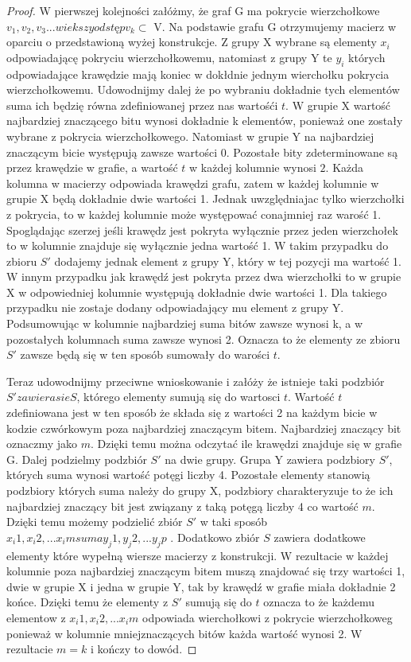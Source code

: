 \begin{proof}
W pierwszej kolejności załóżmy, że graf G ma pokrycie wierzchołkowe $ { v_1,v_2, v_3 ... wiekszy odstęp  v_k} \subset $ V. Na podstawie grafu G otrzymujemy macierz w oparciu o przedstawioną wyżej konstrukcje. Z grupy X wybrane są elementy $x_i$ odpowiadającę pokryciu wierzchołkowemu, natomiast z grupy Y te $y_i$ których odpowiadające krawędzie mają koniec w dokłdnie jednym wierchołku pokrycia wierzchołkowemu. Udowodnijmy dalej że po wybraniu dokładnie tych elementów suma ich będzię równa zdefiniowanej przez nas wartośći $t$. W grupie X wartość najbardziej znaczącego bitu wynosi dokładnie k elementów, ponieważ one zostały wybrane z pokrycia wierzchołkowego. Natomiast w grupie Y na najbardziej znaczącym bicie występują zawsze wartości 0. Pozostałe bity zdeterminowane są przez krawędzie w grafie, a wartość $t$ w każdej kolumnie wynosi $2$. Każda kolumna w macierzy odpowiada krawędzi grafu, zatem w każdej kolumnie w grupie X będą dokładnie dwie wartości 1. Jednak uwzględniajac tylko wierzchołki z pokrycia, to w każdej kolumnie może występować conajmniej raz warość 1. Spoglądając szerzej jeśli krawędz jest pokryta wyłącznie przez jeden wierzchołek to w kolumnie znajduje się wyłącznie jedna wartość 1. W takim przypadku do zbioru $S'$ dodajemy jednak element z grupy Y, który w tej pozycji ma wartość 1. W innym przypadku jak krawędź jest pokryta przez dwa wierzchołki to w grupie X w odpowiedniej kolumnie występują dokładnie dwie wartości 1. Dla takiego przypadku nie zostaje dodany odpowiadający mu element z grupy Y. Podsumowując w kolumnie najbardziej suma bitów zawsze wynosi k, a w pozostałych kolumnach suma zawsze wynosi 2. Oznacza to że elementy ze zbioru $S'$ zawsze będą się w ten sposób sumowały do warości $t$.

Teraz udowodnijmy przeciwne wnioskowanie i załóży że istnieje taki podzbiór $S' zawierasie S$, którego elementy sumują się do wartosci $t$.  Wartość $t$ zdefiniowana jest w ten sposób że składa się z wartości 2 na każdym bicie w kodzie czwórkowym poza najbardziej znaczącym bitem. Najbardziej znaczący bit oznaczmy jako $m$. Dzięki temu można odczytać ile krawędzi znajduje się w grafie G. Dalej podzielmy podzbiór $S'$ na dwie grupy. Grupa Y zawiera podzbiory $ S' $, których suma wynosi wartość potęgi liczby 4. Pozostałe elementy stanowią podzbiory których suma należy do grupy X, podzbiory charakteryzuje to że ich najbardziej znaczący bit jest związany z taką potęgą liczby 4 co wartość $m$. Dzięki temu możemy podzielić zbiór $ S' $ w taki sposób $ { x_i1, x_i2, ... x_im } suma { y_j1, y_j2, ... y_jp } $ . Dodatkowo zbiór $ S $ zawiera dodatkowe elementy które wypełną wiersze macierzy z konstrukcji. W rezultacie w każdej kolumnie poza najbardziej znaczącym bitem muszą znajdować się trzy wartości 1, dwie w grupie X i jedna w grupie Y, tak by krawędź w grafie miała dokładnie 2 końce. Dzięki temu że elementy z $S'$ sumują się do $t$ oznacza to że każdemu elementow z $ {x_i1, x_i2, ... x_im}$ odpowiada wierchołkowi z pokrycie wierzchołkoweg ponieważ w kolumnie mniejznaczących bitów każda wartość wynosi 2. W rezultacie $m = k$ i kończy to dowód. 



\end{proof}
